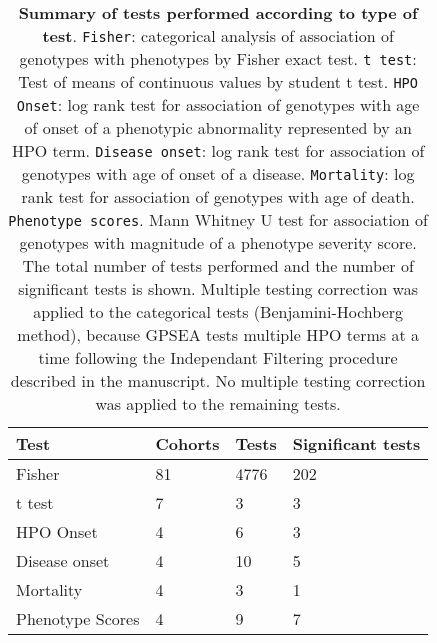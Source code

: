
\begin{table}
\centering
\begin{tabular}{llll}
\toprule
\textbf{Test} & \textbf{Cohorts} & \textbf{Tests} & \textbf{Significant tests}\\
\midrule
Fisher & 81 & 4776 & 202\\
t test & 7 & 3 & 3\\
HPO Onset & 4 & 6 & 3\\
Disease onset & 4 & 10 & 5\\
Mortality & 4 & 3 & 1\\
Phenotype Scores & 4 & 9 & 7\\
\bottomrule
\end{tabular}
\caption{\textbf{Summary of tests performed according to type of test}. \texttt{Fisher}: categorical analysis of association of genotypes with phenotypes by Fisher exact test. \texttt{t test}: Test of means of continuous values by student t test. \texttt{HPO Onset}: log rank test for association of genotypes with age of onset of a phenotypic abnormality represented by an HPO term. \texttt{Disease onset}: log rank test for association of genotypes with age of onset of a disease. \texttt{Mortality}: log rank test for association of genotypes with age of death. \texttt{Phenotype scores}. Mann Whitney U test for association of genotypes with magnitude of a phenotype severity score. The total number of tests performed and the number of significant tests is shown. Multiple testing correction was applied to the categorical tests (Benjamini-Hochberg method), because GPSEA tests multiple HPO terms at a time following the Independant Filtering procedure described in the manuscript. No multiple testing correction was applied to the remaining tests.}
\label{tab:to_do}
\end{table}

